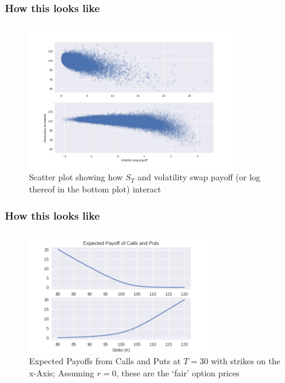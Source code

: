\documentclass[serif]{beamer}
\begin{document}
\begin{frame}
    \frametitle{How this looks like}
    \begin{figure}
        \includegraphics[width=0.8\textwidth]{./images/vol_swap_scatter.png}
        \caption{
            Scatter plot showing how $S_T$ and volatility swap
            payoff (or log thereof in the bottom plot) interact
        }
    \end{figure}
\end{frame}

\begin{frame}
    \frametitle{How this looks like}
    \begin{figure}
        \includegraphics[width=0.7\textwidth]{./images/call_put_payoff.png}
        \caption{
            Expected Payoffs from Calls and Puts at $T=30$ with strikes
            on the x-Axis; Assuming $r=0$, these are the `fair' option prices
        }
    \end{figure}
\end{frame}
\end{document}
